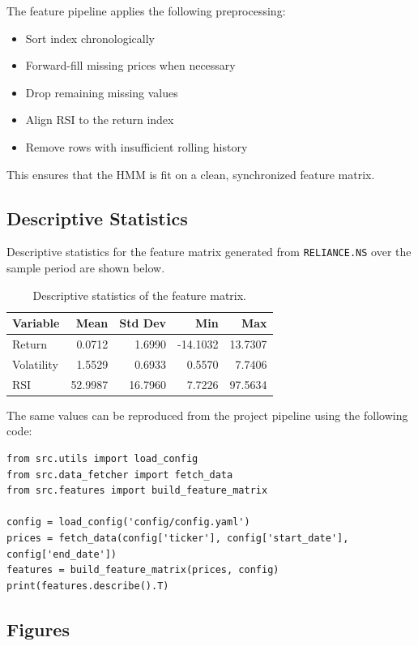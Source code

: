 \documentclass[11pt,a4paper]{article}
\begin{document}
The feature pipeline applies the following preprocessing:

\begin{itemize}
    \item Sort index chronologically
    \item Forward-fill missing prices when necessary
    \item Drop remaining missing values
    \item Align RSI to the return index
    \item Remove rows with insufficient rolling history
\end{itemize}

This ensures that the HMM is fit on a clean, synchronized feature matrix.

\subsection{Descriptive Statistics}

Descriptive statistics for the feature matrix generated from \texttt{RELIANCE.NS} over the sample period are shown below.

\begin{table}[H]
\centering
\begin{tabular}{lrrrr}
\toprule
Variable & Mean & Std Dev & Min & Max \\
\midrule
Return & 0.0712 & 1.6990 & -14.1032 & 13.7307 \\
Volatility & 1.5529 & 0.6933 & 0.5570 & 7.7406 \\
RSI & 52.9987 & 16.7960 & 7.7226 & 97.5634 \\
\bottomrule
\end{tabular}
\caption{Descriptive statistics of the feature matrix.}
\end{table}

The same values can be reproduced from the project pipeline using the following code:

\begin{verbatim}
from src.utils import load_config
from src.data_fetcher import fetch_data
from src.features import build_feature_matrix

config = load_config('config/config.yaml')
prices = fetch_data(config['ticker'], config['start_date'], config['end_date'])
features = build_feature_matrix(prices, config)
print(features.describe().T)
\end{verbatim}

\subsection{Figures}
\end{document}

